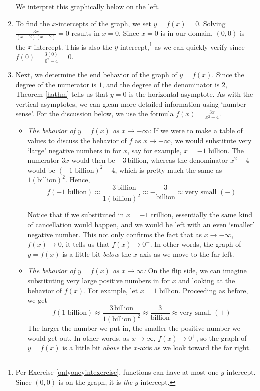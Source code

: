 \documentclass{ximera}
\begin{document}
\begin{example}
\begin{enumerate}
We interpret this graphically below on the left.


\item  To find the $x$-intercepts of the graph, we set $y=f(x) = 0$.  Solving $ \frac{3x}{(x-2)(x+2)} = 0$ results in $x=0$.  Since $x=0$ is in our domain, $(0,0)$ is the $x$-intercept.   This is also the $y$-intercept,\footnote{Per Exercise \ref{onlyoneyintexercise}, functions can have at most one $y$-intercept. Since $(0,0)$ is on the graph,  it is \textit{the} $y$-intercept.} as we can quickly verify since $f(0) = \frac{3(0)}{0^2-4} = 0$.


\item  Next, we determine the end behavior of the graph of $y=f(x)$.  Since the degree of the numerator is $1$, and the degree of the denominator is $2$, Theorem \ref{hathm} tells us that $y=0$ is the horizontal asymptote.  As with the vertical asymptotes, we can glean more detailed information using `number sense'. For the discussion below, we use the formula $f(x) = \frac{3x}{x^2-4}$. 

\begin{itemize}

\item  \textit{The behavior of $y=f(x)$ as $x \rightarrow -\infty$:}  If we were to make a table of values to discuss the behavior of $f$ as $x \rightarrow -\infty$, we would substitute very `large' negative numbers in for $x$, say for example, $x = \text{$-1$ billion}$.  The numerator $3x$ would then be $-3 \, \text{billion}$, whereas the denominator $x^2-4$ would be $(\text{$-1$ billion})^2 - 4$, which is pretty much the same as  $1(\text{billion})^2$.  Hence, \[f\left(\text{$-1$ billion}\right) \approx \dfrac{-3 \, \text{billion}}{1(\text{billion})^2} \approx - \dfrac{3}{\text{billion}} \approx \text{very small $(-)$} \]

Notice that if we substituted in $x = \text{$-1$ trillion}$, essentially the same kind of cancellation would happen, and we would be left with an even `smaller' negative number.  This not only confirms the fact that as $x \rightarrow -\infty$, $f(x) \rightarrow 0$, it tells us that $f(x) \rightarrow 0^{-}$. In other words, the graph of $y=f(x)$ is a little bit \textit{below} the $x$-axis as we move to the far left.


\item  \textit{The behavior of $y=f(x)$ as $x \rightarrow \infty$:}  On the flip side, we can imagine substituting very large positive numbers in for $x$ and looking at the behavior of $f(x)$.   For example, let $x = \text{$1$ billion}$. Proceeding as before, we get \[f\left(\text{$1$ billion}\right) \approx \dfrac{3 \, \text{billion}}{1(\text{billion})^2} \approx \dfrac{3}{\text{billion}} \approx \text{very small $(+)$} \]  The larger the number we put in, the smaller the positive number we would get out.  In other words, as $x \rightarrow \infty$, $f(x) \rightarrow 0^{+}$, so the graph of $y=f(x)$ is a little bit \emph{above} the $x$-axis as we look toward the far right.  


\end{itemize}
\end{enumerate}
\end{example}
\end{document}
